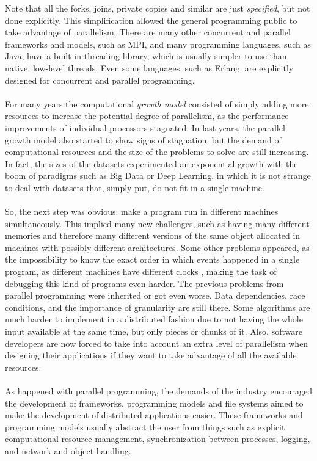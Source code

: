 Note that all the forks, joins, private copies and similar are just \textit{specified}, but not done explicitly. This simplification allowed the general programming public to take advantage of parallelism. There are many other concurrent and parallel frameworks and models, such as MPI\cite{Forum:1994:MMI:898758}, and many programming languages, such as Java, have a built-in threading library, which is usually simpler to use than native, low-level threads. Even some languages, such as Erlang, are explicitly designed for concurrent and parallel programming.\\
\\
For many years the computational \textit{growth model} consisted of simply adding more resources to increase the potential degree of parallelism, as the performance improvements of individual processors stagnated. In last years, the parallel growth model also started to show signs of stagnation, but the demand of computational resources and the size of the problems to solve are still increasing. In fact, the sizes of the datasets experimented an exponential growth with the boom of paradigms such as Big Data or Deep Learning, in which it is not strange to deal with datasets that, simply put, do not fit in a single machine.\\
\\
So, the next step was obvious: make a program run in different machines simultaneously. This implied many new challenges, such as having many different memories and therefore many different versions of the same object allocated in machines with possibly different architectures. Some other problems appeared, as the impossibility to know the exact order in which events happened in a single program, as different machines have different clocks \cite{Lamport}, making the task of debugging this kind of programs even harder. The previous problems from parallel programming were inherited or got even worse. Data dependencies, race conditions, and the importance of granularity are still there. Some algorithms are much harder to implement in a distributed fashion due to not having the whole input available at the same time, but only pieces or chunks of it. Also, software developers are now forced to take into account an extra level of parallelism when designing their applications if they want to take advantage of all the available resources.\\
\\
As happened with parallel programming, the demands of the industry encouraged the development of frameworks, programming models and file systems aimed to make the development of distributed applications easier. These frameworks and programming models usually abstract the user from things such as explicit computational resource management, synchronization between processes, logging, and network and object handling.\\
